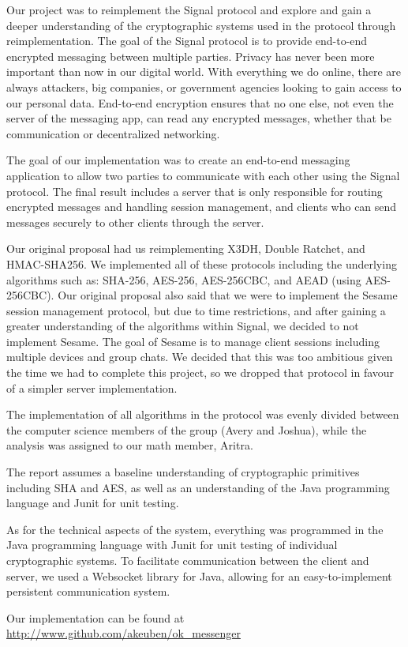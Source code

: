 Our project was to reimplement the Signal protocol and explore and gain a deeper understanding of 
the cryptographic systems used in the protocol through reimplementation. The goal of the Signal protocol 
is to provide end-to-end encrypted messaging between multiple parties. Privacy has 
never been more important than now in our digital world. With everything we do online, 
there are always attackers, big companies, or government agencies looking to gain access to our personal
data. End-to-end encryption ensures that no one else, not even the server of the messaging app, can read 
any encrypted messages, whether that be communication or decentralized networking.

The goal of our implementation was to create an end-to-end messaging application to allow two parties 
to communicate with each other using the Signal protocol. The final result includes a server that is only
responsible for routing encrypted messages and handling session management, and clients who can send messages
securely to other clients through the server.

Our original proposal had us reimplementing X3DH, Double Ratchet, and HMAC-SHA256. We implemented all of these protocols
including the underlying algorithms such as: SHA-256, AES-256, AES-256CBC, and AEAD (using AES-256CBC). 
Our original proposal also said that we were to implement the Sesame session management protocol, but due to time restrictions,
and after gaining a greater understanding of the algorithms within Signal, we decided to not implement Sesame.
The goal of Sesame is to manage client sessions including multiple devices and group chats. We decided that this was too ambitious 
given the time we had to complete this project, so we dropped that protocol in favour of a simpler server implementation.

The implementation of all algorithms in the protocol was evenly divided between the computer science members of the group (Avery and Joshua), while the analysis was assigned to our math member, Aritra.

The report assumes a baseline understanding of cryptographic primitives including SHA and AES, as well as an understanding of the Java programming language and Junit for unit testing.

As for the technical aspects of the system, everything was programmed in the Java programming language with Junit for unit testing of 
individual cryptographic systems. To facilitate communication between the client and server, we used a Websocket library for Java,
allowing for an easy-to-implement persistent communication system.

Our implementation can be found at \url{http://www.github.com/akeuben/ok_messenger}
